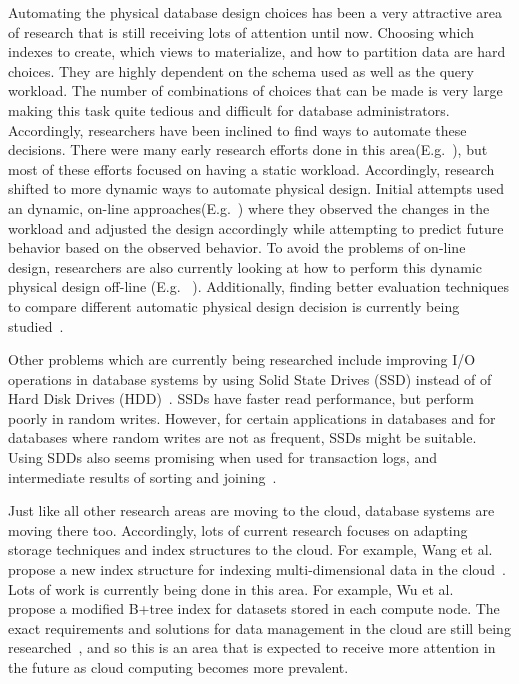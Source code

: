 \documentclass[12pt,a4paper]{article}
\begin{document}
Automating the physical database design choices has been a very attractive area of research that is still receiving lots of attention until now. Choosing which
indexes to create, which views to materialize, and how to partition data are hard choices. They are highly dependent on the schema used as well
as the query workload. The number of combinations of choices that can be made is very large making this task quite tedious and difficult for database
administrators. Accordingly, researchers have been inclined to find ways to automate these decisions. There were many early research efforts done in this
area(E.g.~\cite{finkelstein1988physical, hammer76selec, frank1992selec, chaudhuri1997overview, schiefer1999db2, valentin2000select}), but most of these efforts
focused on having a static workload. Accordingly, research shifted to more dynamic ways to automate physical design. Initial attempts used an dynamic, on-line
approaches(E.g.~\cite{bruno2007online, sattler2003, schnaitter2007}) where they observed the changes in the workload and adjusted the design accordingly while
attempting to predict future behavior based on the observed behavior. To avoid the problems of on-line design, researchers are also currently looking at how to
perform this dynamic physical design off-line (E.g. ~\cite{hannes2008,agrawal2006}). Additionally, finding better evaluation techniques to compare different
automatic physical design decision is currently being studied~\cite{gebaly2008}.

Other problems which are currently being researched include improving I/O operations in database systems by using Solid State Drives (SSD) instead of of Hard
Disk Drives (HDD)~\cite{lee2009, du2009, lee2008}. SSDs have faster read performance, but perform poorly in random writes. However, for certain applications in
databases and for databases where random writes are not as frequent, SSDs might be suitable. Using SDDs also seems promising when used for
transaction logs, and intermediate results of sorting and joining~\cite{lee2008}.

Just like all other research areas are moving to the cloud, database systems are moving there too. Accordingly, lots of current research focuses on adapting
storage techniques and index structures to the cloud. For example, Wang et al. propose a new index structure for indexing multi-dimensional data in the
cloud~\cite{wang2010indexing}. Lots of work is currently being done in this area. For example, Wu et al.~\cite{wu2010efficient} propose a modified B+tree index
for datasets stored in each compute node. The exact requirements and solutions for data management in the cloud are still being
researched~\cite{abadi2009data}, and so this is an area that is expected to receive more attention in the future as cloud computing becomes more prevalent.
\end{document}

